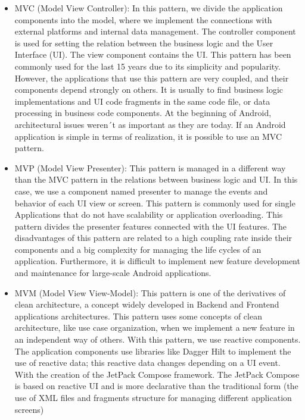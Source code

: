 \begin{itemize}
	\item MVC (Model View Controller): In this pattern, we divide the application components into the model, where we implement the connections with external platforms and internal data management. The controller component is used for setting the relation between the business logic and the User Interface (UI). The view component contains the UI. This pattern has been commonly used for the last 15 years due to its simplicity and popularity. However, the applications that use this pattern are very coupled, and their components depend strongly on others. It is usually to find business logic implementations and UI code fragments in the same code file, or data processing in business code components.  At the beginning of Android, architectural issues weren´t as important as they are today. If an Android application is simple in terms of realization, it is possible to use an MVC pattern.
	
	\item MVP (Model View Presenter): This pattern is managed in a different way than the MVC pattern in the relations between business logic and UI. In this case, we use a component named presenter to manage the events and behavior of each UI view or screen. This pattern is commonly used for single Applications that do not have scalability or application overloading. This pattern divides the presenter features connected with the UI features. The disadvantages of this pattern are related to a high coupling rate inside their components and a big complexity for managing the life cycles of an application. Furthermore, it is difficult to implement new feature development and maintenance for large-scale Android applications.
	
	\item MVM (Model View View-Model): This pattern is one of the derivatives of clean architecture, a concept widely developed in Backend and Frontend applications architectures. This pattern uses some concepts of clean architecture, like use case organization, when we implement a new feature in an independent way of others. With this pattern, we use reactive components. The application components use libraries like Dagger Hilt to implement the use of reactive data; this reactive data changes depending on a UI event. With the creation of the JetPack Compose framework. The JetPack Compose is based on reactive UI and is more declarative than the traditional form (the use of XML files and fragments structure for managing different application screens)
\end{itemize}

